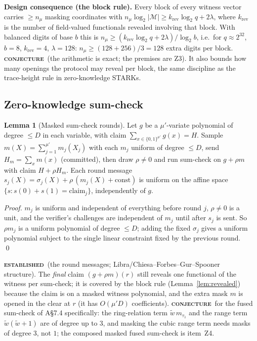 \documentclass[11pt]{article}
\newcommand{\epitag}[3]{\colorbox{#2}{\textcolor{#1}{\textsc{\footnotesize\bfseries #3}}}}
\newcommand{\established}{\epitag{estgreen}{estbg}{established}}
\newcommand{\conjectureTag}{\epitag{conjyellow}{conjbg}{conjecture}}
\renewcommand{\_}{\textunderscore\allowbreak{}}
\theoremstyle{definition}
\newtheorem{lemma}[definition]{Lemma}
\begin{document}
\textbf{Design consequence (the block rule).} Every block of every witness vector carries $\ge n_\mu$ masking coordinates with $n_\mu\log_2|\mathcal{M}|\ge k_{\mathrm{rev}}\log_2q+2\lambda$, where $k_{\mathrm{rev}}$ is the number of field-valued functionals revealed involving that block. With balanced digits of base $b$ this is $n_\mu\ge(k_{\mathrm{rev}}\log_2q+2\lambda)/\log_2b$, i.e.\ for $q\approx2^{32}$, $b=8$, $k_{\mathrm{rev}}=4$, $\lambda=128$: $n_\mu\ge(128+256)/3=128$ extra digits per block. \conjectureTag\ (the arithmetic is exact; the premises are Z3). It also bounds how many openings the protocol may reveal per block, the same discipline as the trace-height rule in zero-knowledge STARKs.

\subsection{Zero-knowledge sum-check}
\begin{lemma}[Masked sum-check rounds]
\label{lem:zksc}
Let $g$ be a $\mu'$-variate polynomial of degree $\le D$ in each variable, with claim $\sum_{x\in\{0,1\}^{\mu'}}g(x)=H$. Sample $m(X)=\sum_{j=1}^{\mu'}m_j(X_j)$ with each $m_j$ uniform of degree $\le D$, send $H_m=\sum_xm(x)$ (committed), then draw $\rho\ne0$ and run sum-check on $g+\rho m$ with claim $H+\rho H_m$. Each round message $s_j(X)=\sigma_j(X)+\rho\,(m_j(X)+\text{const})$ is uniform on the affine space $\{s:s(0)+s(1)=\text{claim}_j\}$, independently of $g$.
\end{lemma}
\begin{proof}
$m_j$ is uniform and independent of everything before round $j$, $\rho\ne0$ is a unit, and the verifier's challenges are independent of $m_j$ until after $s_j$ is sent. So $\rho m_j$ is a uniform polynomial of degree $\le D$; adding the fixed $\sigma_j$ gives a uniform polynomial subject to the single linear constraint fixed by the previous round. \qed
\end{proof}
\established\ (the round messages; Libra/Chiesa--Forbes--Gur--Spooner structure). The \emph{final} claim $(g+\rho m)(r)$ still reveals one functional of the witness per sum-check; it is covered by the block rule (Lemma~\ref{lem:revealed}) because the claim is on a masked witness polynomial, and the extra mask $m$ is opened in the clear at $r$ (it has $O(\mu'D)$ coefficients). \conjectureTag\ for the fused sum-check of A\S7.4 specifically: the ring-relation term $\widetilde w\,m_{\tau_1}$ and the range term $\widetilde w(\widetilde w+1)$ are of degree up to $3$, and masking the cubic range term needs masks of degree $3$, not $1$; the composed masked fused sum-check is item~Z4.
\end{document}
